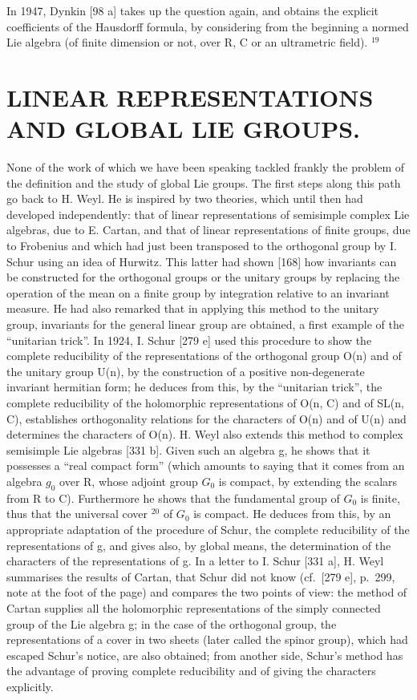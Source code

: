 In 1947, Dynkin {[}98 a{]} takes up the question again, and obtains the explicit coefficients of the Hausdorff formula, by considering from the beginning a normed Lie algebra (of finite dimension or not, over R, C or an ultrametric field). \(^{19}\)

\section{LINEAR REPRESENTATIONS AND GLOBAL LIE GROUPS.}

None of the work of which we have been speaking tackled frankly the problem of the definition and the study of global Lie groups. The first steps along this path go back to H. Weyl. He is inspired by two theories, which until then had developed independently: that of linear representations of semisimple complex Lie algebras, due to E. Cartan, and that of linear representations of finite groups, due to Frobenius and which had just been transposed to the orthogonal group by I. Schur using an idea of Hurwitz. This latter had shown {[}168{]} how invariants can be constructed for the orthogonal groups or the unitary groups by replacing the operation of the mean on a finite group by integration relative to an invariant measure. He had also remarked that in applying this method to the unitary group, invariants for the general linear group are obtained, a first example of the ``unitarian trick''. In 1924, I. Schur {[}279 e{]} used this procedure to show the complete reducibility of the representations of the orthogonal group O(n) and of the unitary group U(n), by the construction of a positive non-degenerate invariant hermitian form; he deduces from this, by the ``unitarian trick'', the complete reducibility of the holomorphic representations of O(n, C) and of SL(n, C), establishes orthogonality relations for the characters of O(n) and of U(n) and determines the characters of O(n). H. Weyl also extends this method to complex semisimple Lie algebras {[}331 b{]}. Given such an algebra g, he shows that it possesses a ``real compact form'' (which amounts to saying that it comes from an algebra \(g_{0}\) over R, whose adjoint group \(G_{0}\) is compact, by extending the scalars from R to C). Furthermore he shows that the fundamental group of \(G_{0}\) is finite, thus that the universal cover \(^{20}\) of \(G_{0}\) is compact. He deduces from this, by an appropriate adaptation of the procedure of Schur, the complete reducibility of the representations of g, and gives also, by global means, the determination of the characters of the representations of g. In a letter to I. Schur {[}331 a{]}, H. Weyl summarises the results of Cartan, that Schur did not know (cf.~{[}279 e{]}, p.~299, note at the foot of the page) and compares the two points of view: the method of Cartan supplies all the holomorphic representations of the simply connected group of the Lie algebra g; in the case of the orthogonal group, the representations of a cover in two sheets (later called the spinor group), which had escaped Schur's notice, are also obtained; from another side, Schur's method has the advantage of proving complete reducibility and of giving the characters explicitly.

